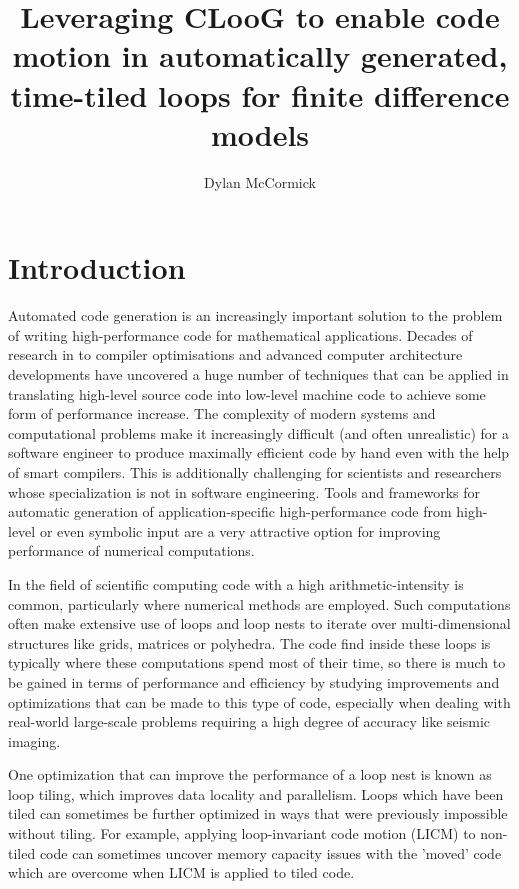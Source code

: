 \documentclass[a4paper,12pt,twoside]{report}
\title{Leveraging CLooG to enable code motion in automatically generated, time-tiled loops for finite difference models}
\author{Dylan McCormick}
\begin{document}
\maketitle

\tableofcontents

\begin{abstract}
\end{abstract}

\chapter{Introduction}
Automated code generation is an increasingly important solution to the problem of writing high-performance code
for mathematical applications. Decades of research in to compiler optimisations and advanced computer architecture developments
have uncovered a huge number of techniques that can be applied in translating high-level source code into low-level machine code
to achieve some form of performance increase. The complexity of modern systems and computational problems make it increasingly 
difficult (and often unrealistic) for a software engineer to produce maximally efficient code by hand even with the help of smart
compilers. This is additionally challenging for scientists and researchers whose specialization is not in software engineering. Tools
and frameworks for automatic generation of application-specific high-performance code from high-level or even symbolic input are a very
attractive option for improving performance of numerical computations.

In the field of scientific computing code with a high arithmetic-intensity is common, particularly where numerical methods are employed.
Such computations often make extensive use of loops and loop nests to iterate over multi-dimensional structures like grids, matrices or
polyhedra. The code find inside these loops is typically where these computations spend most of their time, so there is much to be gained
in terms of performance and efficiency by studying improvements and optimizations that can be made to this type of code, especially when dealing
with real-world large-scale problems requiring a high degree of accuracy like seismic imaging.

One optimization that can improve the performance of a loop nest is known as loop tiling, which improves data locality and parallelism.
Loops which have been tiled can sometimes be further optimized in ways that were previously impossible without tiling. For example, 
applying loop-invariant code motion (LICM) to non-tiled code can sometimes uncover memory capacity issues with the 'moved' code which are
overcome when LICM is applied to tiled code.
\end{document}
